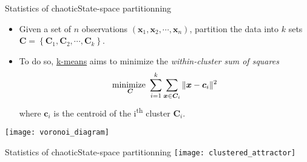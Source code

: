 \begin{frame}[t, c]{Statistics of chaotic}{State-space partitionning}
  \begin{minipage}{.68\textwidth}
    \begin{itemize}
    \item Given a set of \( n \) observations \( (\bm{x}_1, \bm{x}_2, \cdots, \bm{x}_n) \), partition the data into \( k \) sets \( \bm{C} = \left\{ \bm{C}_1, \bm{C}_2, \cdots, \bm{C}_k \right\} \).
      
      \medskip
      
    \item To do so, \underline{k-means} aims to minimize the \emph{within-cluster sum of squares}
      \[
        \operatorname*{minimize~}_{\bm{C}} \sum_{i=1}^k \sum_{\bm{x} \in \bm{C}_i} \| \bm{x} - \bm{c}_i \|^2
      \]
      where \( \bm{c}_i \) is the centroid of the i\textsuperscript{th} cluster \( \bm{C}_i \).
    \end{itemize}
  \end{minipage}%
  \hfill
  \begin{minipage}{.28\textwidth}
    \centering
    \texttt{[image: voronoi\_diagram]}
  \end{minipage}
  
  \vspace{1cm}
\end{frame}

\begin{frame}[t, c]{Statistics of chaotic}{State-space partitionning}
  \centering
  \texttt{[image: clustered\_attractor]}
  
  \vspace{1cm}
\end{frame}

